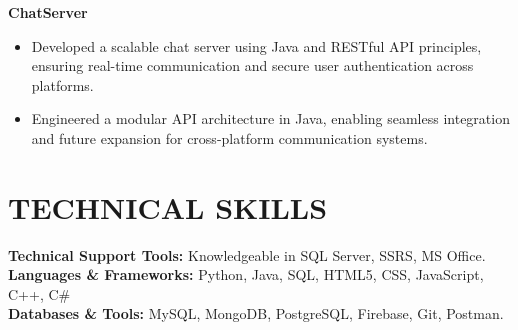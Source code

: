 \documentclass[11pt]{article}
\begin{document}
\textbf{ChatServer}
\begin{itemize}[leftmargin=*, itemsep=2pt]
    \item Developed a scalable chat server using Java and RESTful API principles, ensuring real-time communication and secure user authentication across platforms.
    \item Engineered a modular API architecture in Java, enabling seamless integration and future expansion for cross-platform communication systems.
\end{itemize}

\section*{TECHNICAL SKILLS}

\textbf{Technical Support Tools:} Knowledgeable in SQL Server, SSRS, MS Office. \\
\textbf{Languages \& Frameworks:} Python, Java, SQL, HTML5, CSS, JavaScript, C++, C\# \\
\textbf{Databases \& Tools:} MySQL, MongoDB, PostgreSQL, Firebase, Git, Postman.
\end{document}
